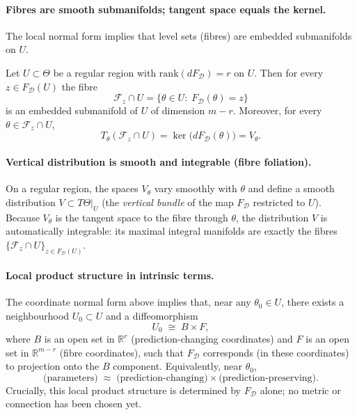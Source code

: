 \paragraph{Fibres are smooth submanifolds; tangent space equals the kernel.}
The local normal form implies that level sets (fibres) are embedded submanifolds on $U$.

\begin{gprop}
\label{prop:fibres_smooth}
Let $U\subset\Theta$ be a regular region with $\mathrm{rank}(dF_{\mathcal D})=r$ on $U$.
Then for every $z\in F_{\mathcal D}(U)$ the fibre
\[
\mathcal F_z \cap U = \{\theta\in U:\;F_{\mathcal D}(\theta)=z\}
\]
is an embedded submanifold of $U$ of dimension $m-r$. Moreover, for every $\theta\in \mathcal F_z\cap U$,
\[
T_\theta(\mathcal F_z\cap U)=\ker\!\bigl(dF_{\mathcal D}(\theta)\bigr)=V_\theta.
\]
\end{gprop}

\paragraph{Vertical distribution is smooth and integrable (fibre foliation).}
On a regular region, the spaces $V_\theta$ vary smoothly with $\theta$ and define a smooth distribution
$V\subset T\Theta|_U$ (the \emph{vertical bundle} of the map $F_{\mathcal D}$ restricted to $U$).
Because $V_\theta$ is the tangent space to the fibre through $\theta$, the distribution $V$
is automatically integrable: its maximal integral manifolds are exactly the fibres
$\{\mathcal F_z\cap U\}_{z\in F_{\mathcal D}(U)}$.

\paragraph{Local product structure in intrinsic terms.}
The coordinate normal form above implies that, near any $\theta_0\in U$, there exists a neighbourhood
$U_0\subset U$ and a diffeomorphism
\[
U_0 \;\cong\; B \times F,
\]
where $B$ is an open set in $\mathbb R^r$ (prediction-changing coordinates) and $F$ is an open set in
$\mathbb R^{m-r}$ (fibre coordinates), such that $F_{\mathcal D}$ corresponds (in these coordinates) to
projection onto the $B$ component. Equivalently, near $\theta_0$,
\[
\text{(parameters)} \;\approx\; \text{(prediction-changing)} \times \text{(prediction-preserving)}.
\]
Crucially, this local product structure is determined by $F_{\mathcal D}$ alone; no metric or connection
has been chosen yet.

